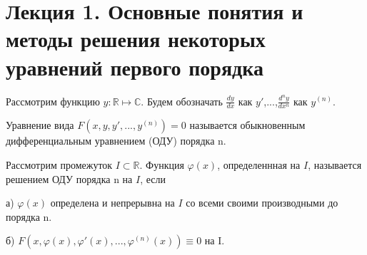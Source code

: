 \documentclass[document.tex]{subfiles}
\begin{document}
\section*{Лекция 1. Основные понятия и методы решения некоторых уравнений первого порядка}
Рассмотрим функцию $y:\mathbb{R}\mapsto\mathbb{C}$. Будем обозначать $\frac{dy}{dx}$ как $y'$,...,$\frac{d^ny}{dx^n}$ как $y^{(n)}$.
\begin{definition}
Уравнение вида $F(x,y,y',...,y^{(n)})=0$  называется обыкновенным дифференциальным уравнением (ОДУ) порядка n.
\end{definition}
\begin{definition}
Рассмотрим промежуток $I \subset \mathbb{R}$. Функция $\varphi(x)$, определеннная на $I$, называется решением ОДУ порядка n на $I$, если


а) $\varphi(x)$ определена и непрерывна  на $I$ со всеми своими производными до порядка n.


б) $F(x,\varphi(x),\varphi'(x),...,\varphi^{(n)}(x))\equiv0$ на I.
\end{definition}
\end{document}
